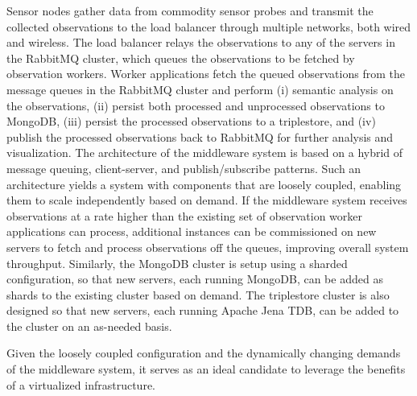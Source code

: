 Sensor nodes gather data from commodity sensor probes and transmit the collected observations to the load balancer through multiple networks, both wired and wireless. The load balancer relays the observations to any of the servers in the RabbitMQ cluster, which queues the observations to be fetched by  observation workers. Worker applications fetch the queued observations from the message queues in the RabbitMQ cluster and perform (i) semantic analysis on the observations, (ii) persist both processed and unprocessed  observations to MongoDB, (iii) persist the processed observations to a triplestore, and (iv) publish the processed observations back to RabbitMQ for further analysis and visualization. The architecture of the middleware system is based on a hybrid of message queuing, client-server, and publish/subscribe patterns. Such an architecture yields a system with components that are loosely coupled, enabling them to scale independently based on demand. If the middleware system receives observations at a rate higher than the existing set of observation worker applications can process, additional instances can be commissioned on new servers to fetch and process observations off the queues, improving overall system throughput. Similarly, the MongoDB cluster is setup using a sharded configuration, so that new servers, each running MongoDB, can be added as shards to the existing cluster based on demand. The triplestore cluster is also designed so that new servers, each running Apache Jena TDB, can be added to the cluster on an as-needed basis.

Given the loosely coupled configuration and the dynamically changing demands of the middleware system, it serves as an ideal candidate to leverage the benefits of a virtualized infrastructure.   



%
%
%
%
%
%
%
%
%






